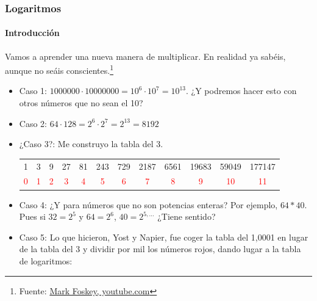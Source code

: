 \subsubsection{Logaritmos}

\paragraph{Introducción}

Vamos a aprender una nueva manera de multiplicar. En realidad ya sabéis, aunque no seáis conscientes.\footnote{Fuente: \href{https://www.youtube.com/watch?v=FB3\_BeukBBk\&t=99s}{Mark Foskey, youtube.com}}


\begin{itemize}
\item Caso 1: $1000000·10000000 = 10^6·10^7 = 10^{13}$. ¿Y podremos hacer esto con otros números que no sean el 10?

\item Caso 2: $64·128 = 2^6·2^7 = 2^{13} = 8192$
\item ¿Caso 3?: Me construyo la tabla del 3.
\begin{center}
\begin{tabular}{cccccccccccc}
1& 3& 9& 27& 81& 243& 729& 2187& 6561& 19683& 59049& 177147\\
\textcolor{red}{0} & \textcolor{red}{1} & \textcolor{red}{2} & \textcolor{red}{3} & \textcolor{red}{4} & \textcolor{red}{5} & \textcolor{red}{6} & \textcolor{red}{7} & \textcolor{red}{8} & \textcolor{red}{9} & \textcolor{red}{10} & \textcolor{red}{11}
\end{tabular}
\end{center}
\item Caso 4: ¿Y para números que no son potencias enteras? Por ejemplo, $64*40$. Pues si $32=2^5$ y $64=2^6$, $40=2^{5,...}$ ¿Tiene sentido?
\item Caso 5: Lo que hicieron, Yost y Napier, fue coger la tabla del 1,0001 en lugar de la tabla del 3 y dividir por mil los números rojos, dando lugar a la tabla de logaritmos:


\end{itemize}
